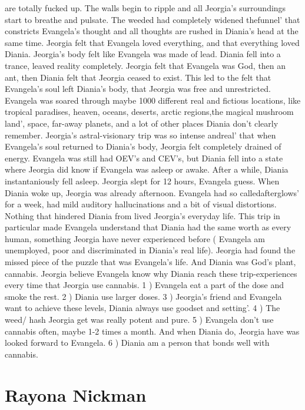 \documentclass[12pt]{book}
\begin{document}
are totally fucked up. The walls begin to ripple and all Jeorgia's surroundings start to breathe and pulsate. The weeded had completely widened thefunnel' that constricts Evangela's thought and all thoughts are rushed in Diania's head at the same time. Jeorgia felt that Evangela loved everything, and that everything loved Diania. Jeorgia's body felt like Evangela was made of lead. Diania fell into a trance, leaved reality completely. Jeorgia felt that Evangela was God, then an ant, then Diania felt that Jeorgia ceased to exist. This led to the felt that Evangela's soul left Diania's body, that Jeorgia was free and unrestricted. Evangela was soared through maybe 1000 different real and fictious locations, like tropical paradises, heaven, oceans, deserts, arctic regions,the magical mushroom land', space, far-away planets, and a lot of other places Diania don't clearly remember. Jeorgia's astral-visionary trip was so intense andreal' that when Evangela's soul returned to Diania's body, Jeorgia felt completely drained of energy. Evangela was still had OEV's and CEV's, but Diania fell into a state where Jeorgia did know if Evangela was asleep or awake. After a while, Diania instantaniously fell asleep. Jeorgia slept for 12 hours, Evangela guess. When Diania woke up, Jeorgia was already afternoon. Evangela had so calledafterglows' for a week, had mild auditory hallucinations and a bit of visual distortions. Nothing that hindered Diania from lived Jeorgia's everyday life. This trip in particular made Evangela understand that Diania had the same worth as every human, something Jeorgia have never experienced before ( Evangela am unemployed, poor and discriminated in Diania's real life). Jeorgia had found the missed piece of the puzzle that was Evangela's life. And Diania was God's plant, cannabis. Jeorgia believe Evangela know why Diania reach these trip-experiences every time that Jeorgia use cannabis. 1 ) Evangela eat a part of the dose and smoke the rest. 2 ) Diania use larger doses. 3 ) Jeorgia's friend and Evangela want to achieve these levels, Diania always use goodset and setting'. 4 ) The weed/ hash Jeorgia get was really potent and pure. 5 ) Evangela don't use cannabis often, maybe 1-2 times a month. And when Diania do, Jeorgia have was looked forward to Evangela. 6 ) Diania am a person that bonds well with cannabis.



\chapter{Rayona Nickman}
\end{document}
